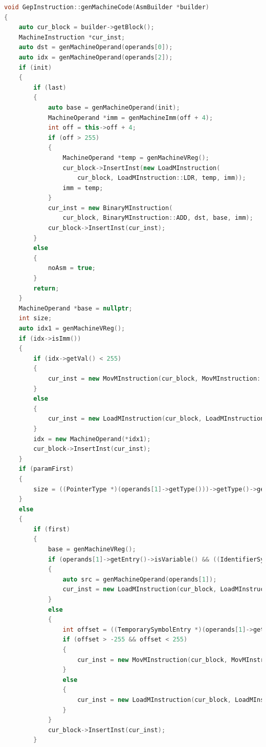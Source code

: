\documentclass[UTF8,a4paper,10pt]{ctexart}
\begin{document}
\begin{lstlisting}[title = 数组的目标代码生成, language = c++]
void GepInstruction::genMachineCode(AsmBuilder *builder)
{
    auto cur_block = builder->getBlock();
    MachineInstruction *cur_inst;
    auto dst = genMachineOperand(operands[0]);
    auto idx = genMachineOperand(operands[2]);
    if (init)
    {
        if (last)
        {
            auto base = genMachineOperand(init);
            MachineOperand *imm = genMachineImm(off + 4);
            int off = this->off + 4;
            if (off > 255)
            {
                MachineOperand *temp = genMachineVReg();
                cur_block->InsertInst(new LoadMInstruction(
                    cur_block, LoadMInstruction::LDR, temp, imm));
                imm = temp;
            }
            cur_inst = new BinaryMInstruction(
                cur_block, BinaryMInstruction::ADD, dst, base, imm);
            cur_block->InsertInst(cur_inst);
        }
        else
        {
            noAsm = true;
        }
        return;
    }
    MachineOperand *base = nullptr;
    int size;
    auto idx1 = genMachineVReg();
    if (idx->isImm())
    {
        if (idx->getVal() < 255)
        {
            cur_inst = new MovMInstruction(cur_block, MovMInstruction::MOV, idx1, idx);
        }
        else
        {
            cur_inst = new LoadMInstruction(cur_block, LoadMInstruction::LDR, idx1, idx);
        }
        idx = new MachineOperand(*idx1);
        cur_block->InsertInst(cur_inst);
    }
    if (paramFirst)
    {
        size = ((PointerType *)(operands[1]->getType()))->getType()->getSize() / 8;
    }
    else
    {
        if (first)
        {
            base = genMachineVReg();
            if (operands[1]->getEntry()->isVariable() && ((IdentifierSymbolEntry *)(operands[1]->getEntry()))->isGlobal())
            {
                auto src = genMachineOperand(operands[1]);
                cur_inst = new LoadMInstruction(cur_block, LoadMInstruction::LDR, base, src);
            }
            else
            {
                int offset = ((TemporarySymbolEntry *)(operands[1]->getEntry()))->getOffset();
                if (offset > -255 && offset < 255)
                {
                    cur_inst = new MovMInstruction(cur_block, MovMInstruction::MOV, base, genMachineImm(offset));
                }
                else
                {
                    cur_inst = new LoadMInstruction(cur_block, LoadMInstruction::LDR, base, genMachineImm(offset));
                }
            }
            cur_block->InsertInst(cur_inst);
        }


\end{lstlisting}
\end{document}
